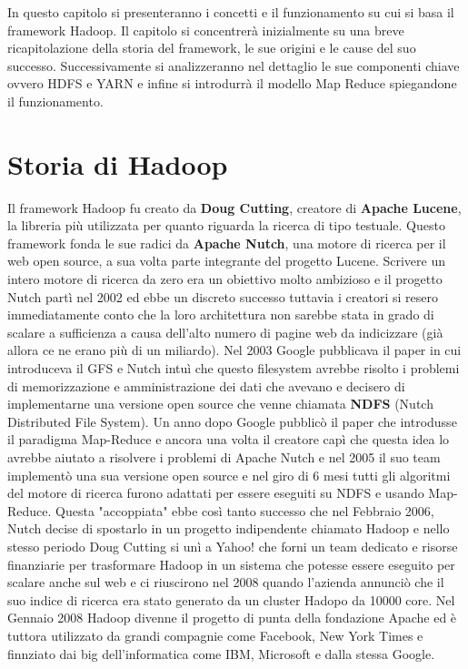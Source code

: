 In questo capitolo si presenteranno i concetti e il funzionamento su cui si basa il framework Hadoop. Il capitolo si concentrerà inizialmente su una breve ricapitolazione della storia del framework, le sue origini e le cause del suo successo. Successivamente si analizzeranno nel dettaglio le sue componenti chiave ovvero HDFS e YARN e infine si introdurrà il modello Map Reduce spiegandone il funzionamento.
\section{Storia di Hadoop}
Il framework Hadoop fu creato da \textbf{Doug Cutting}, creatore di \textbf{Apache Lucene}, la libreria più utilizzata per quanto riguarda la ricerca di tipo testuale. Questo framework fonda le sue radici da \textbf{Apache Nutch}, una motore di ricerca per il web open source, a sua volta parte integrante del progetto Lucene. Scrivere un intero motore di ricerca da zero era un obiettivo molto ambizioso e il progetto Nutch partì nel 2002 ed ebbe un discreto successo tuttavia i creatori si resero immediatamente conto che la loro architettura non sarebbe stata in grado di scalare a sufficienza a causa dell'alto numero di pagine web da indicizzare (già allora ce ne erano più di un miliardo). Nel 2003 Google pubblicava il paper in cui introduceva il GFS e Nutch intuì che questo filesystem avrebbe risolto i problemi di memorizzazione e amministrazione dei dati che avevano e decisero di implementarne una versione open source che venne chiamata \textbf{NDFS} (Nutch Distributed File System). Un anno dopo Google pubblicò il paper che introdusse il paradigma Map-Reduce e ancora una volta il creatore capì che questa idea lo avrebbe aiutato a risolvere i problemi di Apache Nutch e nel 2005 il suo team implementò una sua versione open source e nel giro di 6 mesi tutti gli algoritmi del motore di ricerca furono adattati per essere eseguiti su NDFS e usando Map-Reduce. Questa "accoppiata" ebbe così tanto successo che nel Febbraio 2006, Nutch decise di spostarlo in un progetto indipendente chiamato Hadoop e nello stesso periodo Doug Cutting si unì a Yahoo! che forni un team dedicato e risorse finanziarie per trasformare Hadoop in un sistema che potesse essere eseguito per scalare anche sul web e ci riuscirono nel 2008 quando l'azienda annunciò che il suo indice di ricerca era stato generato da un cluster Hadopo da 10000 core. Nel Gennaio 2008 Hadoop divenne il progetto di punta della fondazione Apache ed è tuttora utilizzato da grandi compagnie come Facebook, New York Times e finnziato dai big dell'informatica come IBM, Microsoft e dalla stessa Google.
